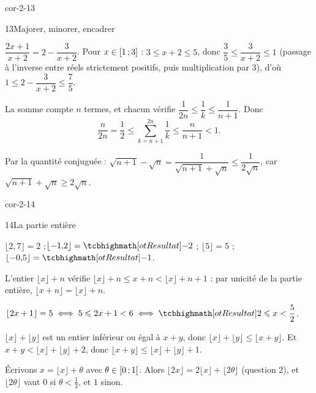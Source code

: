 \begin{blocLivre}{cor-2-13}
\begin{corrige}{13}{Majorer, minorer, encadrer}
\begin{questions}
  \item $\dfrac{2x+1}{x+2}=2-\dfrac{3}{x+2}$. Pour $x\in\mathopen{[}1\,{;}\,3\mathclose{]}$ :
    $3\leq x+2\leq5$, donc $\dfrac35\leq\dfrac{3}{x+2}\leq1$ (passage à
    l'inverse entre réels strictement positifs, puis multiplication par $3$),
    d'où $1\leq2-\dfrac{3}{x+2}\leq\dfrac75$.
  \item La somme compte $n$ termes, et chacun vérifie
    $\dfrac{1}{2n}\leq\dfrac{1}{k}\leq\dfrac{1}{n+1}$. Donc
    \[
      \frac{n}{2n}=\frac12\leq\sum_{k=n+1}^{2n}\frac{1}{k}\leq\frac{n}{n+1}<1.
    \]
  \item Par la quantité conjuguée :
    $\sqrt{n+1}-\sqrt{n}=\dfrac{1}{\sqrt{n+1}+\sqrt{n}}\leq\dfrac{1}{2\sqrt{n}}$,
    car $\sqrt{n+1}+\sqrt{n}\geq2\sqrt{n}$.
\end{questions}
\end{corrige}
\end{blocLivre}

\begin{blocLivre}{cor-2-14}
\begin{corrige}{14}{La partie entière}
\begin{questions}
  \item $\lfloor2{,}7\rfloor=2$ ;\quad $\lfloor-1{,}2\rfloor=\res{-2}$ ;\quad
    $\lfloor5\rfloor=5$ ;\quad $\lfloor-0{,}5\rfloor=\res{-1}$.
  \item L'entier $\lfloor x\rfloor+n$ vérifie
    $\lfloor x\rfloor+n\leq x+n<\lfloor x\rfloor+n+1$ : par unicité de la
    partie entière, $\lfloor x+n\rfloor=\lfloor x\rfloor+n$.
  \item $\lfloor2x+1\rfloor=5\iff5\leq2x+1<6\iff\res{2\leq x<\dfrac52}$.
  \item $\lfloor x\rfloor+\lfloor y\rfloor$ est un entier inférieur ou égal à
    $x+y$, donc $\lfloor x\rfloor+\lfloor y\rfloor\leq\lfloor x+y\rfloor$.
    Et $x+y<\lfloor x\rfloor+\lfloor y\rfloor+2$, donc
    $\lfloor x+y\rfloor\leq\lfloor x\rfloor+\lfloor y\rfloor+1$.
  \item Écrivons $x=\lfloor x\rfloor+\theta$ avec $\theta\in\mathopen{[}0\,{;}\,1\mathclose{[}$.
    Alors $\lfloor2x\rfloor=2\lfloor x\rfloor+\lfloor2\theta\rfloor$
    (question 2), et $\lfloor2\theta\rfloor$ vaut $0$ si
    $\theta<\frac12$, et $1$ sinon.
\end{questions}
\end{corrige}
\end{blocLivre}

